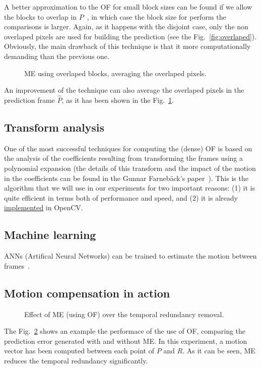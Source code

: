 A better approximation to the OF for small block sizes can be found if
we allow the blocks to overlap in $P$~\cite{orchard1994overlapped}, in
which case the block size for perform the comparisons is
larger. Again, as it happens with the disjoint case, only the non
overlaped pixels are used for building the prediction (see the
Fig.~\ref{fig:overlaped}). Obviously, the main drawback of this
technique is that it more computationally demanding than the previous
one.

\begin{figure}
  \centering
  \caption{ME using overlaped blocks, averaging the overlaped pixels.}
  \label{fig:average}
\end{figure}

An improvement of the technique can also average the overlaped pixels
in the prediction frame $\hat{P}$, as it has been shown in the
Fig.~\ref{fig:average}.

\subsection{Transform analysis}
One of the most successful techniques for computing the (dense) OF is
based on the analysis of the coefficients resulting from transforming
the frames using a polynomial expansion (the details of this transform
and the impact of the motion in the coefficients can be found in the
Gunnar Farneb{\"a}ck's paper~\cite{farneback2003two}). This is the
algorithm that we will use in our experiments for two important
reasons: (1) it is quite efficient in terms both of performance and
speed, and (2) it is already
\href{https://docs.opencv.org/3.4/d4/dee/tutorial_optical_flow.html}{implemented}
in OpenCV.

\subsection{Machine learning}
ANNs (Artifical Neural Networks) can be trained to estimate the
motion between frames~\cite{dosovitskiy2015flownet}.

\subsection{Motion compensation in action}
\begin{figure}
  \caption{Effect of ME (using OF) over the temporal redundancy
    removal.}
  \label{fig:MC}
\end{figure}
The Fig.~\ref{fig:MC} shows an example the performace of the use of
OF, comparing the prediction error generated with and without ME. In
this experiment, a motion vector has been computed between each point
of $P$ and $R$. As it can be seen, ME reduces the temporal redundancy
significantly.

